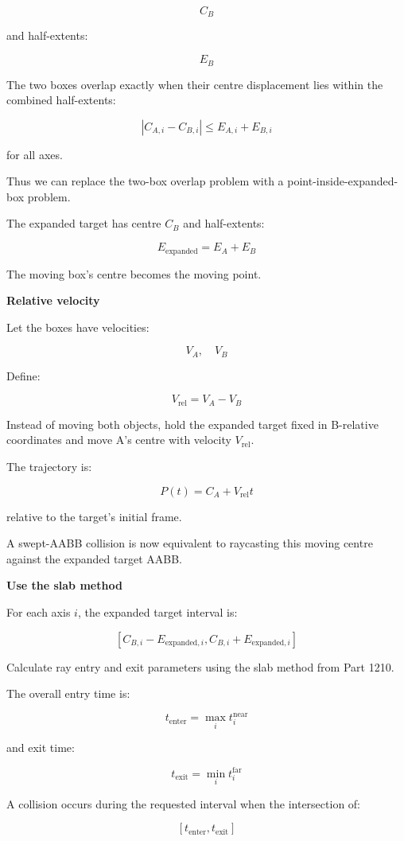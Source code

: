 \[
C_B
\]

and half-extents:

\[
E_B
\]

The two boxes overlap exactly when their centre displacement lies within the combined half-extents:

\[
\boxed{ |C_{A,i}-C_{B,i}|\le E_{A,i}+E_{B,i} }
\]

for all axes.

Thus we can replace the two-box overlap problem with a point-inside-expanded-box problem.

The expanded target has centre \(C_B\) and half-extents:

\[
\boxed{ E_{\mathrm{expanded}}=E_A+E_B }
\]

The moving box's centre becomes the moving point.

\textbf{Relative velocity}

Let the boxes have velocities:

\[
V_A,\quad V_B
\]

Define:

\[
\boxed{ V_{\mathrm{rel}}=V_A-V_B }
\]

Instead of moving both objects, hold the expanded target fixed in B-relative coordinates and move A's centre with velocity \(V_{\mathrm{rel}}\).

The trajectory is:

\[
\boxed{ P(t)=C_A+V_{\mathrm{rel}}t }
\]

relative to the target's initial frame.

A swept-AABB collision is now equivalent to raycasting this moving centre against the expanded target AABB.

\textbf{Use the slab method}

For each axis \(i\), the expanded target interval is:

\[
[C_{B,i}-E_{\mathrm{expanded},i}, C_{B,i}+E_{\mathrm{expanded},i}]
\]

Calculate ray entry and exit parameters using the slab method from Part 1210.

The overall entry time is:

\[
\boxed{ t_{\mathrm{enter}}=\max_i t_i^{\mathrm{near}} }
\]

and exit time:

\[
\boxed{ t_{\mathrm{exit}}=\min_i t_i^{\mathrm{far}} }
\]

A collision occurs during the requested interval when the intersection of:

\[
[t_{\mathrm{enter}},t_{\mathrm{exit}}]
\]

